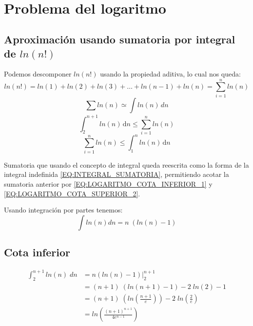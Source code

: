 \section{Problema del logaritmo}
\subsection{Aproximación usando sumatoria por integral de $ln(n!)$}

Podemos descomponer $ln(n!)$ usando la propiedad aditiva, lo cual nos queda:
\begin{equation}
	ln(n!) = ln(1) + ln(2) + ln(3) + \ldots + ln(n-1) + ln(n) 
	=
	\sum_{i=1}^{n}ln(n)
\end{equation}\label{EQ:LOGARITMO_ADITIVA}
\begin{equation}\label{EQ:INTEGRAL_SUMATORIA}
	\sum_{}^{}ln(n) \simeq \int ln(n)\,dn
\end{equation}
\begin{equation}\label{EQ:LOGARITMO_COTA_INFERIOR_1}
	\int_{2}^{n+1} \! ln(n) \, \mathrm{d}n 
	\leq
	\sum_{i=1}^{n}ln(n)
\end{equation}
\begin{equation}\label{EQ:LOGARITMO_COTA_SUPERIOR_2}
	\sum_{i=1}^{n}ln(n)
	\leq
	\int_{1}^{n} \! ln(n) \, \mathrm{d}n 
\end{equation}

Sumatoria que usando el concepto de integral queda reescrita como la forma de la integral indefinida \ref{EQ:INTEGRAL_SUMATORIA}, permitiendo acotar la sumatoria anterior por \ref{EQ:LOGARITMO_COTA_INFERIOR_1} y \ref{EQ:LOGARITMO_COTA_SUPERIOR_2}.

Usando integración por partes tenemos:
\begin{equation}
	\int ln(n)dn = n\;(ln(n)-1)
\end{equation}

\subsection{Cota inferior}
\begin{align}
	\int_{2}^{n+1} \! ln(n)\;dn &= n(ln(n)-1) \bigg|_{2}^{n+1} \nonumber \\
	&=(n+1)\;\left(ln(n+1)-1\right) - 2\;ln(2) - 1	\nonumber \\
	&=(n+1)\;\left(ln\left(\frac{n+1}{e}\right)\right)-2\;ln\left(\frac{2}{e}\right) \nonumber \\
	&=ln\left(\frac{(n+1)^{n+1}}{4e^{n-1}}\right) \label{EQ:CONCLUSION_COTA_INFERIOR}
\end{align}

